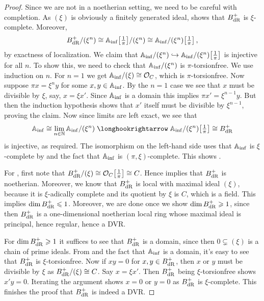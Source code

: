 \documentclass[a4paper, 10pt, oneside, DIV=9, chapterprefix=true, numbers=enddot,bibliography=totoc]{scrbook}
\begin{document}
\begin{proof}
	Since we are not in a noetherian setting, we need to be careful with completion. As $(\xi)$ is obviously a finitely generated ideal, \cite[]{stacks-project} shows that $B_{\mathrm{dR}}^+$ is $\xi$-complete. Moreover,
	\begin{equation*}
		B_{\mathrm{dR}}^+/(\xi^n)\cong \mathbb{A}_{\mathrm{inf}}\big[\textstyle\frac1\pi\big]/(\xi^n)\cong \mathbb{A}_{\mathrm{inf}}/(\xi^n)\big[\textstyle\frac1\pi\big]\,,
	\end{equation*}
	by exactness of localization. We claim that $\IA_\inf/(\xi^n)\monomorphism \IA_\inf/(\xi^n)\localize{\pi}$ is injective for all $n$. To show this, we need to check that $\mathbb{A}_{\mathrm{inf}}/(\xi^n)$ is $\pi$-torsionfree. We use induction on $n$. For $n=1$ we get $\mathbb{A}_{\mathrm{inf}}/(\xi)\cong \mathcal{O}_C$, which is $\pi$-torsionfree. Now suppose $\pi x=\xi^ny$ for some $x,y\in\mathbb{A}_{\mathrm{inf}}$. By the $n=1$ case we see that $x$ must be divisible by $\xi$, say, $x=\xi x'$. Since $\mathbb{A}_{\mathrm{inf}}$ is a domain this implies $\pi x'=\xi^{n-1}y$. But then the induction hypothesis shows that $x'$ itself must be divisible by $\xi^{n-1}$, proving the claim.
	Now since limits are left exact, we see that
	\begin{align*}
		\IA_\inf\cong \lim_{n\in \IN}\IA_\inf/(\xi^n)\monomorphism \IA_\inf/(\xi^n)\localize{\pi}\cong B_\dR^+
	\end{align*}
	is injective, as required. The isomorphism on the left-hand side uses that $\mathbb{A}_{\mathrm{inf}}$ is $\xi$-complete by \cite[]{stacks-project} and the fact that $\mathbb{A}_{\mathrm{inf}}$ is $(\pi,\xi)$-complete. This shows .
	
	For , first note that $B_{\mathrm{dR}}^+/(\xi)\cong \mathcal{O}_C\big[\textstyle\frac{1}{\pi}\big]\cong C$. Hence \cite[]{stacks-project} implies that $B_{\mathrm{dR}}^+$ is noetherian. Moreover, we know that $B_{\mathrm{dR}}^+$ is local with maximal ideal $(\xi)$, because it is $\xi$-adically complete and its quotient by $\xi$ is $C$, which is a field. This implies $\dim B_{\mathrm{dR}}^+\leqslant 1$. Moreover, we are done once we show $\dim B_{\mathrm{dR}}^+\geqslant 1$, since then $B_{\mathrm{dR}}^+$ is a one-dimensional noetherian local ring whose maximal ideal is principal, hence regular, hence a DVR.
	
	For $\dim B_{\mathrm{dR}}^+\geqslant 1$ it suffices to see that $B_{\mathrm{dR}}^+$ is a domain, since then $0\subsetneq (\xi)$ is a chain of prime ideals. From  and the fact that $\mathbb{A}_{\mathrm{inf}}$ is a domain, it's easy to see that $B_{\mathrm{dR}}^+$ is $\xi$-torsionfree. Now if $xy=0$ for $x,y\in B_{\mathrm{dR}}^+$, then $x$ or $y$ must be divisible by $\xi$ as $B_{\mathrm{dR}}^+/(\xi)\cong C$. Say $x=\xi x'$. Then $B_{\mathrm{dR}}^+$ being $\xi$-torsionfree shows $x'y=0$. Iterating the argument shows $x=0$ or $y=0$ as $B_{\mathrm{dR}}^+$ is $\xi$-complete. This finishes the proof that $B_{\mathrm{dR}}^+$ is indeed a DVR.
	

\end{proof}
\end{document}
